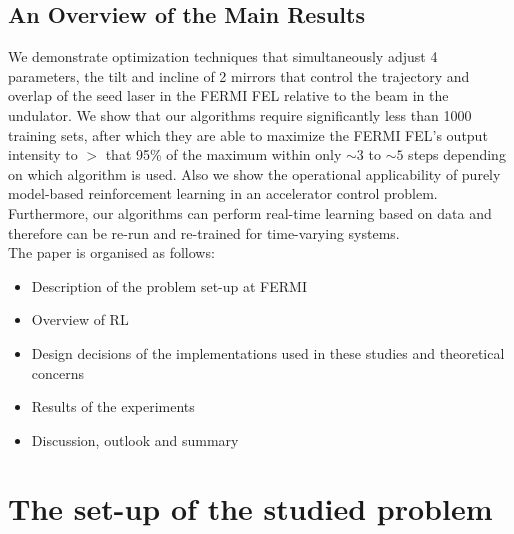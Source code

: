 \documentclass[
reprint,
amsmath,amssymb,amsfonts,clevref,
aps,
prstab,
]{revtex4-2}
\begin{document}
	 \subsection{An Overview of the Main Results}
	 We demonstrate optimization techniques that simultaneously adjust 4 parameters, the tilt and incline of 2 mirrors that control the trajectory and overlap of the seed laser in the FERMI FEL relative to the beam in the undulator. We show that our algorithms require significantly less than 1000 training sets, after which they are able to maximize the FERMI FEL’s output intensity to $>$ that 95\% of the maximum within only $\sim 3$ to $\sim 5$ steps depending on which algorithm is used. Also we show the operational applicability of purely model-based reinforcement learning in an accelerator control problem.\\
	  Furthermore, our algorithms can perform real-time learning based on data and therefore can be re-run and re-trained for time-varying systems.\\
	The paper is organised as follows:
	\begin{itemize}
		\item Description of the problem set-up at FERMI
		\item Overview of RL
		\item Design decisions of the implementations used in these studies and theoretical concerns
		\item Results of the experiments 
		\item Discussion, outlook and summary
	\end{itemize}
	
	
	\section{The set-up of the studied problem}
\end{document}
